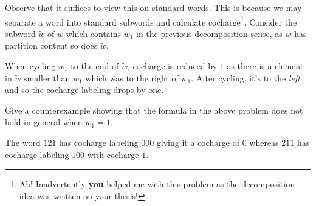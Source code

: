 \documentclass[12pt]{memoir}
\begin{document}
\begin{ptcbr}
Observe that it suffices to view this on standard words. This is because we may separate a word into standard subwords and calculate cocharge\footnote{Ah! Inadvertently \textbf{you} helped me with this problem as the decomposition idea was written on your thesis!}. Consider the subword $\tilde{w}$ of $w$ which contains $w_1$ in the previous decomposition sense, as $w$ has partition content so does $\tilde{w}$.\par
When cycling $w_1$ to the end of $\tilde{w}$, cocharge is reduced by $1$ as there is a element in $\tilde{w}$ smaller than $w_1$ which was to the right of $w_1$. After cycling, it's to the \emph{left} and so the cocharge labeling drops by one. 
\end{ptcbr}

\begin{Ej}
    Give a counterexample showing that the formula in the above problem does not hold in general when $w_1=1$.
\end{Ej}

\begin{ptcbr}
The word $121$ has cocharge labeling $000$ giving it a cocharge of $0$ whereas $211$ has cocharge labeling $100$ with cocharge $1$.
\end{ptcbr}
\end{document}
